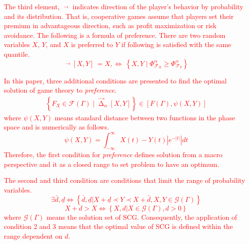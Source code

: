 \documentclass[journal]{IEEEtran} %
\begin{document}
\textcolor{red}{The third element, $\mathop {{\Delta _i}}\limits^ \to$ indicates direction of the player's behavior by probability and its distribution. That is, cooperative games assume that players set their premium in advantageous direction, such as profit maximization or risk avoidance. The following is a formula of preference. There are two random variables $X$, $Y$, and $X$ is preferred to $Y$ if following is satisfied with the same quantile.
\begin{equation}
{\mathop {{\Delta _\alpha}}\limits^ \to}\left[ {X,Y} \right]\ = X,  \Leftrightarrow \ \left\{ {X,Y\;|\;\Phi _{{\mathcal{F}_X}}^\alpha  \ge \Phi _{{\mathcal{F}_Y}}^\alpha } \right\}
\end{equation}
}

\textcolor{red}{In this paper, three additional conditions are presented to find the optimal solution of game theory to \textit{preference}.
\begin{equation}
\begin{array}{l}
\left\{ {{F_X} \in \mathcal{F}(\Gamma )\;|\;{{\mathop \Delta \limits^ \to  }_\alpha }[X,Y]} \right\} \in [F(\Gamma ),\psi (X,Y)]
\end{array}
\end{equation}
where $\psi(X,Y)$ means standard distance between two functions in the phase space and is numerically as follows.
\begin{equation}
\psi (X,Y) = \int_{ - \infty }^\infty  {X(t) - Y(t)\left| {{e^{ - \left| t \right|}}} \right|dt}
\end{equation}
Therefore, the first condition for \textit{preference} defines solution from a macro perspective and it as a closed range to set problem to have an optimum.}

\textcolor{red}{The second and third condition are conditions that limit the range of probability variables.
\begin{equation}
\exists \bar d,\underline{d} \Leftrightarrow \left\{ {\bar d,\underline{d}|X + \underline{d} \prec Y \prec X + \bar d,X,Y \in \mathcal{G}(\Gamma)} \right\}
\end{equation}
\begin{equation}
X + d > X \Leftrightarrow \left\{ {X,d|X \in \mathcal{G}(\Gamma ),d > 0} \right\}
\end{equation}
where $\mathcal{G}(\Gamma)$ means the solution set of SCG. Consequently, the application of condition 2 and 3 means that the optimal value of SCG is defined within the range dependent on $d$.}
\end{document}
